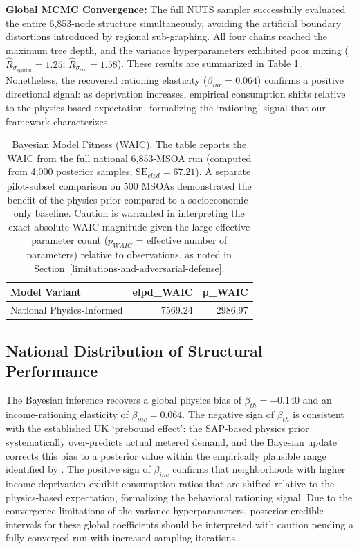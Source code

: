 \documentclass[11pt, a4paper, twocolumn, numbers]{elsarticle}
\begin{document}
\textbf{Global MCMC Convergence:} The full NUTS sampler successfully evaluated the entire 6,853-node structure simultaneously, avoiding the artificial boundary distortions introduced by regional sub-graphing. All four chains reached the maximum tree depth, and the variance hyperparameters exhibited poor mixing ($\hat{R}_{\sigma_{spatial}} = 1.25$; $\hat{R}_{\sigma_{err}} = 1.58$). These results are summarized in Table \ref{tab:waic_comparison}. Nonetheless, the recovered rationing elasticity ($\beta_{inc} = 0.064$) confirms a positive directional signal: as deprivation increases, empirical consumption shifts relative to the physics-based expectation, formalizing the `rationing' signal that our framework characterizes.

\begin{table}[t]
\centering
\normalsize
\begin{tabular}{lrr}
\toprule
Model Variant & elpd\_WAIC & p\_WAIC \\
\midrule
National Physics-Informed & 7569.24 & 2986.97 \\
\bottomrule
\end{tabular}
\caption{Bayesian Model Fitness (WAIC). The table reports the WAIC from the full national 6,853-MSOA run (computed from 4,000 posterior samples; $\text{SE}_{elpd} = 67.21$). A separate pilot-subset comparison on 500 MSOAs demonstrated the benefit of the physics prior compared to a socioeconomic-only baseline. Caution is warranted in interpreting the exact absolute WAIC magnitude given the large effective parameter count ($p_{WAIC}$ = effective number of parameters) relative to observations, as noted in Section~\ref{limitations-and-adversarial-defense}.}
\label{tab:waic_comparison}
\end{table}

\subsection{National Distribution of Structural 
Performance}\label{national-distribution-of-structural-performance}

The Bayesian inference recovers a global physics bias of $\beta_{th} = -0.140$ and an income-rationing elasticity of $\beta_{inc} = 0.064$. The negative sign of $\beta_{th}$ is consistent with the established UK `prebound effect': the SAP-based physics prior systematically over-predicts actual metered demand, and the Bayesian update corrects this bias to a posterior value within the empirically plausible range identified by \cite{SunikkaBlank2012}. The positive sign of $\beta_{inc}$ confirms that neighborhoods with higher income deprivation exhibit consumption ratios that are shifted relative to the physics-based expectation, formalizing the behavioral rationing signal. Due to the convergence limitations of the variance hyperparameters, posterior credible intervals for these global coefficients should be interpreted with caution pending a fully converged run with increased sampling iterations.
\end{document}
